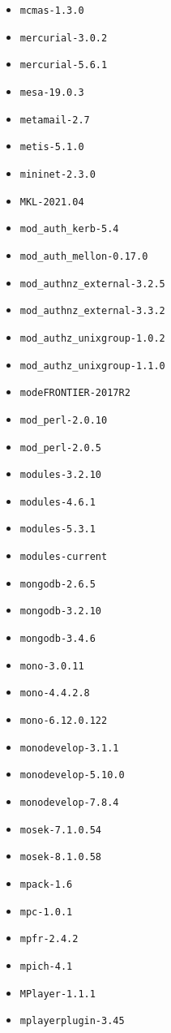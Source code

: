 \begin{itemize}
\item \verb|mcmas-1.3.0|
\item \verb|mercurial-3.0.2|
\item \verb|mercurial-5.6.1|
\item \verb|mesa-19.0.3|
\item \verb|metamail-2.7|
\item \verb|metis-5.1.0|
\item \verb|mininet-2.3.0|
\item \verb|MKL-2021.04|
\item \verb|mod_auth_kerb-5.4|
\item \verb|mod_auth_mellon-0.17.0|
\item \verb|mod_authnz_external-3.2.5|
\item \verb|mod_authnz_external-3.3.2|
\item \verb|mod_authz_unixgroup-1.0.2|
\item \verb|mod_authz_unixgroup-1.1.0|
\item \verb|modeFRONTIER-2017R2|
\item \verb|mod_perl-2.0.10|
\item \verb|mod_perl-2.0.5|
\item \verb|modules-3.2.10|
\item \verb|modules-4.6.1|
\item \verb|modules-5.3.1|
\item \verb|modules-current|
\item \verb|mongodb-2.6.5|
\item \verb|mongodb-3.2.10|
\item \verb|mongodb-3.4.6|
\item \verb|mono-3.0.11|
\item \verb|mono-4.4.2.8|
\item \verb|mono-6.12.0.122|
\item \verb|monodevelop-3.1.1|
\item \verb|monodevelop-5.10.0|
\item \verb|monodevelop-7.8.4|
\item \verb|mosek-7.1.0.54|
\item \verb|mosek-8.1.0.58|
\item \verb|mpack-1.6|
\item \verb|mpc-1.0.1|
\item \verb|mpfr-2.4.2|
\item \verb|mpich-4.1|
\item \verb|MPlayer-1.1.1|
\item \verb|mplayerplugin-3.45|

\end{itemize}
